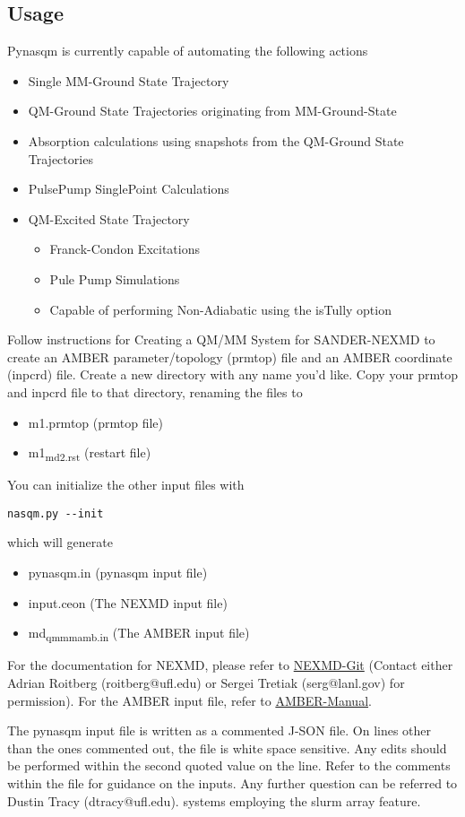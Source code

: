 \documentclass[11pt]{article}
\begin{document}
\subsection{Usage}
\label{sec:orgb5143c1}
Pynasqm is currently capable of automating the following actions
\begin{itemize}
\item Single MM-Ground State Trajectory
\item QM-Ground State Trajectories originating from MM-Ground-State
\item Absorption calculations using snapshots from the QM-Ground State Trajectories
\item PulsePump SinglePoint Calculations
\item QM-Excited State Trajectory
\begin{itemize}
\item Franck-Condon Excitations
\item Pule Pump Simulations
\item Capable of performing Non-Adiabatic using the isTully option
\end{itemize}
\end{itemize}

Follow instructions for Creating a QM/MM System for SANDER-NEXMD to create an
AMBER parameter/topology (prmtop) file and an AMBER coordinate (inpcrd) file.
Create a new directory with any name you'd like.
Copy your prmtop and inpcrd file to that directory, renaming the files to 
\begin{itemize}
\item m1.prmtop (prmtop file)
\item m1\textsubscript{md2.rst} (restart file)
\end{itemize}
You can initialize the other input files with
\begin{verbatim}
nasqm.py --init
\end{verbatim}
which will generate
\begin{itemize}
\item pynasqm.in (pynasqm input file)
\item input.ceon (The NEXMD input file)
\item md\textsubscript{qmmm}\textsubscript{amb.in} (The AMBER input file)
\end{itemize}

For the documentation for NEXMD, please refer to \href{https://github.com/roitberg/nexmd}{NEXMD-Git} (Contact either
Adrian Roitberg (roitberg@ufl.edu) or Sergei Tretiak (serg@lanl.gov) for
permission). For the AMBER input file, refer to \href{https://ambermd.org/doc12/Amber19.pdf}{AMBER-Manual}. 

The pynasqm input file is written as a commented J-SON file. On lines other than the ones
commented out, the file is white space sensitive. Any edits should be performed
within the second quoted value on the line. Refer to the comments within the
file for guidance on the inputs. Any further question can be referred to Dustin
Tracy (dtracy@ufl.edu).
systems employing the slurm array feature.
\end{document}
